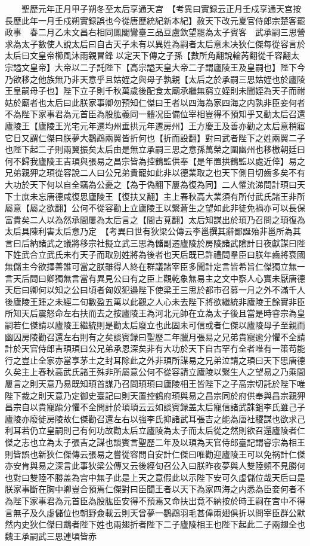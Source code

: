 　　聖歷元年正月甲子朔冬至太后享通天宫　【考異曰實録云正月壬戍享通天宫按長歷此年一月壬戍朔實録誤也今從唐歷統紀新本紀】赦天下改元夏官侍郎宗楚客罷政事　春二月乙未文昌右相同鳳閣鸞臺三品豆盧欽望罷為太子賓客　武承嗣三思營求為太子數使人說太后曰自古天子未有以異姓為嗣者太后意未决狄仁傑每從容言於太后曰文皇帝櫛風沐雨親冒鋒以定天下傳之子孫【數所角翻說輪芮翻從千容翻太宗謚文皇帝】大帝以二子託陛下【高宗謚天皇大帝二子謂廬陵王及皇嗣也】陛下今乃欲移之他族無乃非天意乎且姑姪之與母子孰親【太后之於承嗣三思姑姪也於廬陵王皇嗣母子也】陛下立子則千秋萬歲後配食太廟承繼無窮立姪則未聞姪為天子而祔姑於廟者也太后曰此朕家事卿勿預知仁傑曰王者以四海為家四海之内孰非臣妾何者不為陛下家事君為元首臣為股肱義同一體况臣備位宰相豈得不預知乎又勸太后召還廬陵王【廬陵王光宅元年遷均州垂拱元年遷房州】王方慶王及善亦勸之太后意稍寤它日又謂仁傑曰朕夢大鸚鵡兩翼皆折何也【折而設翻】對曰武者陛下之姓兩翼二子也陛下起二子則兩翼振矣太后由是無立承嗣三思之意孫萬榮之圍幽州也移檄朝廷曰何不歸我廬陵王吉頊與張易之昌宗皆為控鶴監供奉【是年置拱鶴監以處近倖】易之兄弟親狎之頊從容說二人曰公兄弟貴寵如此非以德業取之也天下側目切齒多矣不有大功於天下何以自全竊為公憂之【為于偽翻下屢為復為同】二人懼流涕問計頊曰天下士庶未忘唐德咸復思廬陵王【復扶又翻】主上春秋高大業須有所付武氏諸王非所屬意【屬之欲翻】公何不從容勸上立廬陵王以繋蒼生之望如此非徒免禍亦可以長保富貴矣二人以為然承間屢為太后言之【間古莧翻】太后知謀出於頊乃召問之頊復為太后具陳利害太后意乃定　【考異曰世有狄梁公傳云李邕撰其辭鄙誕殆非邕所為其言曰后納諸武之議將移宗社擬立武三思為儲副遷廬陵於房陵諸武隂計日夜獻謀曰陛下姓武合立武氏未冇天子而取别姓將為後者也天后既已許禮問羣臣曰朕年齒將衰國無儲主今欲擇善誰可當之朕雖得人終在群議諸宰臣多聞計定言皆希旨仁傑獨立無一言天后問曰卿獨無言當有異見公曰有之臣上觀乾象無易主之文中察人心實未厭唐德天后曰卿何以知之公曰頃者匈奴犯邉陛下使梁王三思於都市召募一月之外不滿千人後廬陵王踵之未經二旬數盈五萬以此觀之人心未去陛下將欲繼統非廬陵王餘實非臣所知天后震怒命左右扶而去之按廬陵王為河北元帥在立為太子後且當是時睿宗為皇嗣若仁傑請以廬陵王繼統則是勸太后廢立也此固未可信或者仁傑以廬陵母子至親而幽囚房陵勸召還左右則有之矣談賓録曰聖歷二年臘月張易之兄弟貴寵逾分懼不全請計於天官侍郎吉頊頊曰公兄弟承恩深矣非有大功於天下自古罕冇全者唯有一策苟能行之豈止全家亦當享茅土之封耳除此之外非頊所謀易之兄弟泣請之頊曰天下思唐德久矣主上春秋高武氏諸王殊非所屬意公何不從容請立廬陵以繋生人之望易之乃乘間屢言之則天意乃易既知頊首謀乃召問頊頊曰廬陵相王皆陛下之子高宗切託於陛下唯陛下裁之則天意乃定御史臺記曰則天置控鶴府頊與易之昌宗同於府供奉與昌宗親狎昌宗自以貴寵踰分懼不全問計於頊頊云云如談賓録盖太后寵信諸武誅鉏李氏雖己子廬陵亦廢徙房陵故仁傑勸召還左右以強李氏抑諸武耳張吉之能為唐社稷謀也欲求己利耳若仍立皇嗣則己有何功故勸太后立廬陵為太子而太后從之然則欲召還廬陵者仁傑之志也立為太子張吉之謀也談賓言聖歷二年及以頊為天官侍郎臺記謂睿宗為相王則皆誤也新狄仁傑傳云張易之嘗從容問自安計仁傑曰唯勸迎廬陵王可以免祸計仁傑亦安肯與易之深言此事狄梁公傳又云後經旬召公入曰朕昨夜夢與人雙陸頻不見勝何也對曰雙陸不勝盖為宫中無子此是上天之意假此以示陛下安可久虚儲位哉天后曰是朕家事斷在胸中卿豈合預焉仁傑對曰臣聞王者以天下為家四海之内悉為臣妾何者不為陛下家事君為元首臣為股肱臣安得不預焉又命扶出竟不納按於時王嗣在宫中不得言無子及久虚儲位也朝野僉載云則天曾夢一鸚鵡羽毛甚偉兩翅俱折以問宰臣群公默然内史狄仁傑曰鵡者陛下姓也兩翅折者陛下二子廬陵相王也陛下起此二子兩翅全也魏王承嗣武三思連頃皆赤